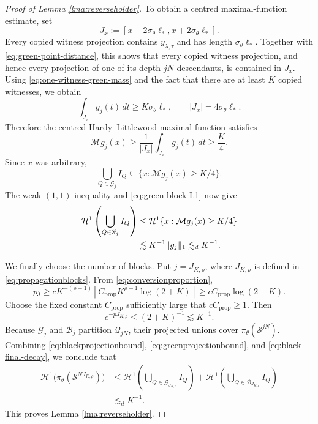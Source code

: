 \documentclass[12pt]{amsart}
\numberwithin{equation}{section}
\newcommand{\cM}{\mathcal{M}}
\begin{document}
\begin{proof}[Proof of Lemma \ref{lma:reverseholder}]
To obtain a centred maximal-function estimate, set
\[
 J_x:=[x-2\sigma_\theta\ell_*,x+2\sigma_\theta\ell_*].
\]
Every copied witness projection contains $y_{\lambda,\tau}$ and has length
$\sigma_\theta\ell_*$.  Together with
\eqref{eq:green-point-distance}, this shows that every copied witness
projection, and hence every projection of one of its depth-$jN$ descendants,
is contained in $J_x$.  Using \eqref{eq:one-witness-green-mass} and the fact
that there are at least $K$ copied witnesses, we obtain
\[
 \int_{J_x}g_j(t)\,dt
 \geq K\sigma_\theta\ell_*,
 \qquad
 |J_x|=4\sigma_\theta\ell_*.
\]
Therefore the centred Hardy--Littlewood maximal function satisfies
\[
 \cM g_j(x)\geq\frac{1}{|J_x|}\int_{J_x}g_j(t)\,dt
 \geq\frac K4.
\]
Since $x$ was arbitrary,
\[
 \bigcup_{Q\in\mathscr G_j}I_Q
 \subseteq\{x:\cM g_j(x)\geq K/4\}.
\]
The weak $(1,1)$ inequality and \eqref{eq:green-block-L1} now give
\begin{align}
 \mathcal H^1\left(\bigcup_{Q\in\mathscr G_j}I_Q\right)
 &\leq\mathcal H^1\{x:\cM g_j(x)\geq K/4\}\notag\\
 &\lesssim K^{-1}\|g_j\|_1
 \lesssim_d K^{-1}.
 \label{eq:greenprojectionbound}
\end{align}

We finally choose the number of blocks.  Put $j=J_{K,\rho}$, where
$J_{K,\rho}$ is defined in \eqref{eq:propagationblocks}.  From
\eqref{eq:conversionproportion},
\[
 pj
 \geq cK^{-(\rho-1)}
 \left\lceil
 C_{\mathrm{prop}}K^{\rho-1}\log(2+K)
 \right\rceil
 \geq cC_{\mathrm{prop}}\log(2+K).
\]
Choose the fixed constant $C_{\mathrm{prop}}$ sufficiently large that
$cC_{\mathrm{prop}}\geq1$.  Then
\begin{equation}\label{eq:black-final-decay}
 e^{-pJ_{K,\rho}}\leq(2+K)^{-1}\lesssim K^{-1}.
\end{equation}
Because $\mathscr G_j$ and $\mathscr B_j$ partition $\mathscr Q_{jN}$,
their projected unions cover $\pi_\theta(\mathcal S^{jN})$.  Combining
\eqref{eq:blackprojectionbound}, \eqref{eq:greenprojectionbound}, and
\eqref{eq:black-final-decay}, we conclude that
\begin{align*}
 \mathcal H^1\bigl(\pi_\theta(\mathcal S^{NJ_{K,\rho}})\bigr)
 &\leq
 \mathcal H^1\left(\bigcup_{Q\in\mathscr G_{J_{K,\rho}}}I_Q\right)
 +
 \mathcal H^1\left(\bigcup_{Q\in\mathscr B_{J_{K,\rho}}}I_Q\right)\\
 &\lesssim_d K^{-1}.
\end{align*}
This proves Lemma \ref{lma:reverseholder}.
\end{proof}
\end{document}
